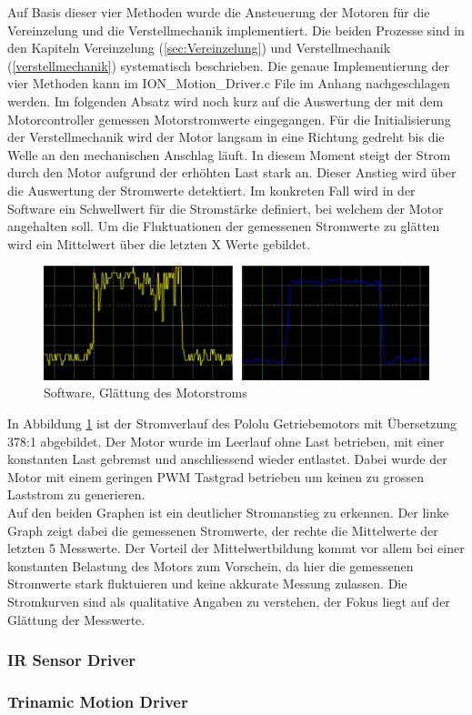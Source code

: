 Auf Basis dieser vier Methoden wurde die Ansteuerung der Motoren für die Vereinzelung und die Verstellmechanik implementiert. Die beiden Prozesse sind in den Kapiteln Vereinzelung (\ref{sec:Vereinzelung}) und Verstellmechanik (\ref{verstellmechanik}) systematisch beschrieben. Die genaue Implementierung der vier Methoden kann im ION\_Motion\_Driver.c File im Anhang nachgeschlagen werden. Im folgenden Absatz wird noch kurz auf die Auswertung der mit dem Motorcontroller gemessen Motorstromwerte eingegangen.\newline
Für die Initialisierung der Verstellmechanik wird der Motor langsam in eine Richtung gedreht bis die Welle an den mechanischen Anschlag läuft. In diesem Moment steigt der Strom durch den Motor aufgrund der erhöhten Last stark an. Dieser Anstieg wird über die Auswertung der Stromwerte detektiert. Im konkreten Fall wird in der Software ein Schwellwert für die Stromstärke definiert, bei welchem der Motor angehalten soll. Um die Fluktuationen der gemessenen Stromwerte zu glätten wird ein Mittelwert über die letzten X Werte gebildet.


\begin{figure}[H]
	\includegraphics[width=1\textwidth]{Illustrationen/6-Umsetzung/ION_Motion_Strommessung.png}
	\caption{Software, Glättung des Motorstroms}
	\label{fig:ION_Motion_Strommessung}
\end{figure}

In Abbildung \ref{fig:ION_Motion_Strommessung} ist der Stromverlauf des Pololu Getriebemotors mit Übersetzung 378:1 abgebildet. Der Motor wurde im Leerlauf ohne Last betrieben, mit einer konstanten Last gebremst und anschliessend wieder entlastet. Dabei wurde der Motor mit einem geringen PWM Tastgrad betrieben um keinen zu grossen Laststrom zu generieren.\\
Auf den beiden Graphen ist ein deutlicher Stromanstieg zu erkennen. Der linke Graph zeigt dabei die gemessenen Stromwerte, der rechte die Mittelwerte der letzten 5 Messwerte. Der Vorteil der Mittelwertbildung kommt vor allem bei einer konstanten Belastung des Motors zum Vorschein, da hier die gemessenen Stromwerte stark fluktuieren und keine akkurate Messung zulassen. Die Stromkurven sind als qualitative Angaben zu verstehen, der Fokus liegt auf der Glättung der Messwerte.


\subsubsection{IR Sensor Driver}

\subsubsection{Trinamic Motion Driver}

